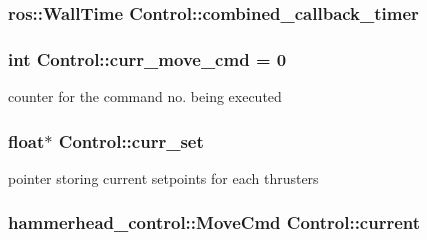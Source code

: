 \subsubsection[{\texorpdfstring{combined\+\_\+callback\+\_\+timer}{combined_callback_timer}}]{\setlength{\rightskip}{0pt plus 5cm}ros\+::\+Wall\+Time Control\+::combined\+\_\+callback\+\_\+timer\hspace{0.3cm}{\ttfamily [private]}}\hypertarget{classControl_a7a1dd562bded08231a44823a213afbee}{}\label{classControl_a7a1dd562bded08231a44823a213afbee}
\subsubsection[{\texorpdfstring{curr\+\_\+move\+\_\+cmd}{curr_move_cmd}}]{\setlength{\rightskip}{0pt plus 5cm}int Control\+::curr\+\_\+move\+\_\+cmd = 0\hspace{0.3cm}{\ttfamily [private]}}\hypertarget{classControl_a6b9bafba66e817433e5fe291dd603518}{}\label{classControl_a6b9bafba66e817433e5fe291dd603518}


counter for the command no. being executed 

\subsubsection[{\texorpdfstring{curr\+\_\+set}{curr_set}}]{\setlength{\rightskip}{0pt plus 5cm}float$\ast$ Control\+::curr\+\_\+set\hspace{0.3cm}{\ttfamily [private]}}\hypertarget{classControl_a42067224edcba565aa68d4bf087e45e8}{}\label{classControl_a42067224edcba565aa68d4bf087e45e8}


pointer storing current setpoints for each thrusters 

\subsubsection[{\texorpdfstring{current}{current}}]{\setlength{\rightskip}{0pt plus 5cm}hammerhead\+\_\+control\+::\+Move\+Cmd Control\+::current\hspace{0.3cm}{\ttfamily [private]}}\hypertarget{classControl_af74f0b009e6e0835715c5c84e5e9fdd5}{}\label{classControl_af74f0b009e6e0835715c5c84e5e9fdd5}


